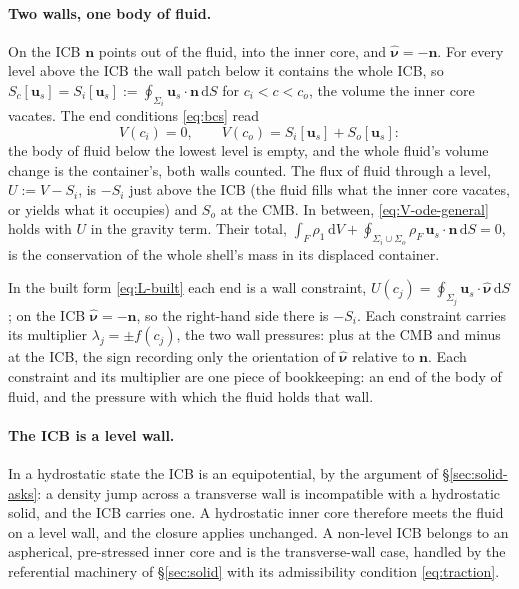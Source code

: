\documentclass[11pt]{article}
\theoremstyle{definition}
\theoremstyle{remark}
\newcommand{\bu}{\mathbf{u}}
\newcommand{\bn}{\mathbf{n}}
\newcommand{\dS}{\,\mathrm{d}S}
\newcommand{\dV}{\,\mathrm{d}V}
\newcommand{\nuh}{\hat{\boldsymbol{\nu}}}
\begin{document}
\paragraph{Two walls, one body of fluid.} On the ICB $\bn$ points out
of the fluid, into the inner core, and $\nuh = -\bn$. For every level
above the ICB the wall patch below it contains the whole ICB, so
$S_c[\bu_s] = S_i[\bu_s] := \oint_{\Sigma_i}\bu_s\cdot\bn\dS$ for $c_i <
c < c_o$, the volume the inner core vacates. The end conditions
\eqref{eq:bcs} read
\begin{equation*}
  V(c_i) = 0,\qquad V(c_o) = S_i[\bu_s] + S_o[\bu_s] :
\end{equation*}
the body of fluid below the lowest level is empty, and the whole
fluid's volume change is the container's, both walls counted. The flux
of fluid through a level, $U := V - S_i$, is $-S_i$ just above the ICB
(the fluid fills what the inner core vacates, or yields what it
occupies) and $S_o$ at the CMB. In between, \eqref{eq:V-ode-general}
holds with $U$ in the gravity term. Their total, $\int_F\rho_1\dV +
\oint_{\Sigma_i\cup\Sigma_o}\rho_F\,\bu_s\cdot\bn\dS = 0$, is the
conservation of the whole shell's mass in its displaced container.

In the built form \eqref{eq:L-built} each end is a wall constraint,
$U(c_j) = \oint_{\Sigma_j}\bu_s\cdot\nuh\dS$; on the ICB $\nuh = -\bn$,
so the right-hand side there is $-S_i$. Each constraint carries its
multiplier $\lambda_j = \pm f(c_j)$, the two wall pressures: plus at
the CMB and minus at the ICB, the sign recording only the orientation
of $\nuh$ relative to $\bn$. Each constraint and its multiplier are one
piece of bookkeeping: an end of the body of fluid, and the pressure
with which the fluid holds that wall.

\paragraph{The ICB is a level wall.} In a hydrostatic state the ICB is
an equipotential, by the argument of \S\ref{sec:solid-asks}: a density
jump across a transverse wall is incompatible with a hydrostatic solid,
and the ICB carries one. A hydrostatic inner core therefore meets the
fluid on a level wall, and the closure applies unchanged. A non-level
ICB belongs to an aspherical, pre-stressed inner core and is the
transverse-wall case, handled by the referential machinery of
\S\ref{sec:solid} with its admissibility condition \eqref{eq:traction}.
\end{document}
